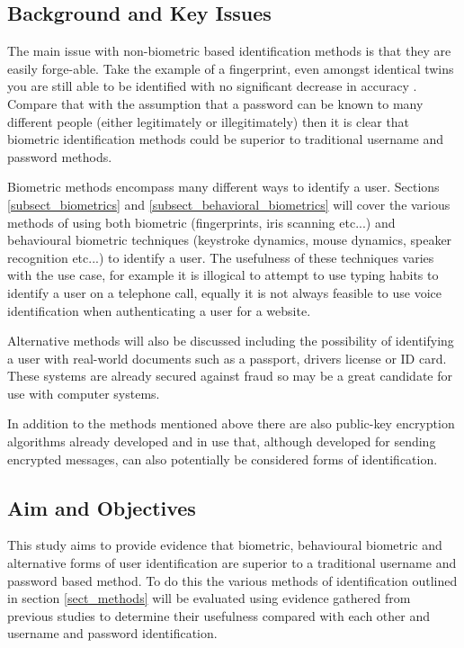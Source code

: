\documentclass[12pt]{article}
\begin{document}
	
	\subsection{Background and Key Issues}
	The main issue with non-biometric based identification methods is that they are easily forge-able. Take the example of a fingerprint, even amongst identical twins you are still able to be identified with no significant decrease in accuracy \citep{han2004study}. Compare that with the assumption that a password can be known to many different people (either legitimately or illegitimately) then it is clear that biometric identification methods could be superior to traditional username and password methods.
	
	Biometric methods encompass many different ways to identify a user. Sections
	\ref{subsect_biometrics} and \ref{subsect_behavioral_biometrics} will cover the various methods of using both biometric (fingerprints, iris scanning etc...) and behavioural biometric techniques (keystroke dynamics, mouse dynamics, speaker recognition etc...) to identify a user. The usefulness of these techniques varies with the use case, for example it is illogical to attempt to use typing habits to identify a user on a telephone call, equally it is not always feasible to use voice identification when authenticating a user for a website.
	
	Alternative methods will also be discussed including the possibility of identifying a user with real-world documents such as a passport, drivers license or ID card. These systems are already secured against fraud so may be a great candidate for use with computer systems. 
	
	In addition to the methods mentioned above there are also public-key encryption algorithms already developed and in use that, although developed for sending encrypted messages, can also potentially be considered forms of identification.
	
	\subsection{Aim and Objectives} 
	This study aims to provide evidence that biometric, behavioural biometric and alternative forms of user identification are superior to a traditional username and password based method.
	To do this the various methods of identification outlined in section \ref{sect_methods} will be evaluated using evidence gathered from previous studies to determine their usefulness compared with each other and username and password identification.
	
\end{document}
